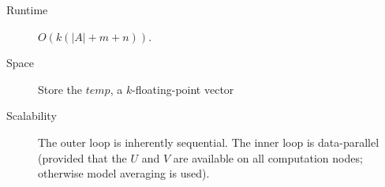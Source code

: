 \begin{description}
	\item[Runtime] $O(k(|A| + m + n))$.
	\item[Space] Store the $temp$, a $k$-floating-point vector
	\item[Scalability] The outer loop is inherently sequential. The inner loop is data-parallel (provided that the $U$ and $V$ are available on all computation nodes; otherwise model averaging is used).
\end{description}
